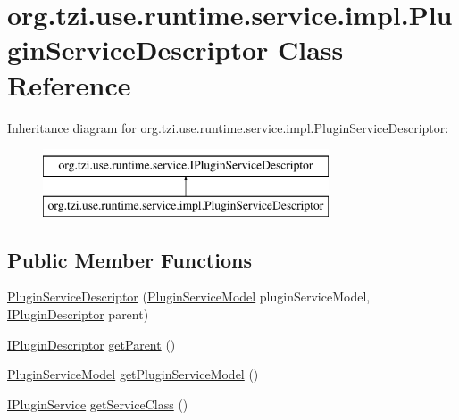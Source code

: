 \hypertarget{classorg_1_1tzi_1_1use_1_1runtime_1_1service_1_1impl_1_1_plugin_service_descriptor}{\section{org.\-tzi.\-use.\-runtime.\-service.\-impl.\-Plugin\-Service\-Descriptor Class Reference}
\label{classorg_1_1tzi_1_1use_1_1runtime_1_1service_1_1impl_1_1_plugin_service_descriptor}
}
Inheritance diagram for org.\-tzi.\-use.\-runtime.\-service.\-impl.\-Plugin\-Service\-Descriptor\-:\begin{figure}[H]
\begin{center}
\leavevmode
\includegraphics[height=2.000000cm]{classorg_1_1tzi_1_1use_1_1runtime_1_1service_1_1impl_1_1_plugin_service_descriptor}
\end{center}
\end{figure}
\subsection*{Public Member Functions}
\begin{DoxyCompactItemize}
\item 
\hyperlink{classorg_1_1tzi_1_1use_1_1runtime_1_1service_1_1impl_1_1_plugin_service_descriptor_a85c52bf17c22a22f1718f4b68c1e470b}{Plugin\-Service\-Descriptor} (\hyperlink{classorg_1_1tzi_1_1use_1_1runtime_1_1model_1_1_plugin_service_model}{Plugin\-Service\-Model} plugin\-Service\-Model, \hyperlink{interfaceorg_1_1tzi_1_1use_1_1runtime_1_1_i_plugin_descriptor}{I\-Plugin\-Descriptor} parent)
\item 
\hyperlink{interfaceorg_1_1tzi_1_1use_1_1runtime_1_1_i_plugin_descriptor}{I\-Plugin\-Descriptor} \hyperlink{classorg_1_1tzi_1_1use_1_1runtime_1_1service_1_1impl_1_1_plugin_service_descriptor_a4faad405eb9f861d557485cd6b5dc350}{get\-Parent} ()
\item 
\hyperlink{classorg_1_1tzi_1_1use_1_1runtime_1_1model_1_1_plugin_service_model}{Plugin\-Service\-Model} \hyperlink{classorg_1_1tzi_1_1use_1_1runtime_1_1service_1_1impl_1_1_plugin_service_descriptor_acaa1aef2b169457be816daad9758d65a}{get\-Plugin\-Service\-Model} ()
\item 
\hyperlink{interfaceorg_1_1tzi_1_1use_1_1runtime_1_1service_1_1_i_plugin_service}{I\-Plugin\-Service} \hyperlink{classorg_1_1tzi_1_1use_1_1runtime_1_1service_1_1impl_1_1_plugin_service_descriptor_a5082b7ae2d72b949349f83b9ccd68bc6}{get\-Service\-Class} ()
\end{DoxyCompactItemize}


